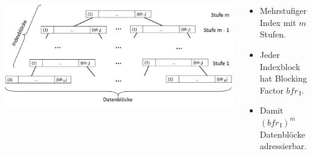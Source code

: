 
\begin{frame}{\insertsection}
\framesubtitle{\insertsubsection}
\\[4pt]
\begin{columns}[T]
\begin{column}{.5\textwidth}
\includegraphics[height=.66\textwidth, width=1.05\textwidth]{img/Index_Multilevel_Zugriffe.png}
\end{column}
\begin{column}{.51\textwidth}
\begin{itemize}
\item Mehrstufiger Index mit $m$ Stufen. 
\item Jeder Indexblock hat Blocking Factor $bfr_\mathrm{\,I}$.
\item Damit $(bfr_\mathrm{\,I})^m$ Datenbl\"ocke adressierbar.

\end{itemize}
\end{column}
\end{columns}
\end{frame}
